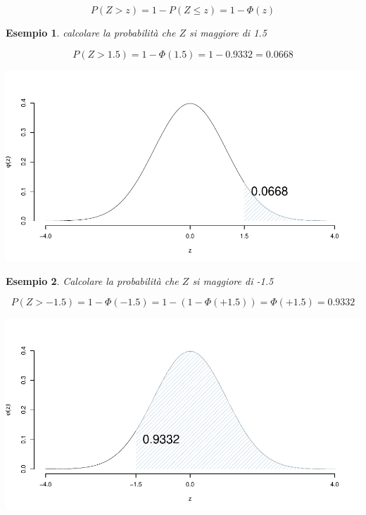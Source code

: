\documentclass[
  11pt,
]{book}
\theoremstyle{mytheoremstyle}
\theoremstyle{mydefstyle}
\newtheorem{example}{{Esempio}}[section]
\begin{document}
\[P(Z>z)=1-P(Z\leq z)=1-\Phi(z)\]

\begin{example}

calcolare la probabilità che \(Z\) si maggiore di 1.5

\[P(Z > 1.5) = 1-\Phi(1.5)=1-0.9332=0.0668\]

\begin{center}\includegraphics{Appunti_di_Statistica_2025_files/figure-latex/07c-Normale-17,-1} \end{center}

\end{example}

\begin{example}

Calcolare la probabilità che \(Z\) si maggiore di -1.5

\[P(Z > -1.5) = 1-\Phi(-1.5)=1-(1-\Phi(+1.5))=\Phi(+1.5)=0.9332\]

\begin{center}\includegraphics{Appunti_di_Statistica_2025_files/figure-latex/07c-Normale-19,-1} \end{center}

\end{example}
\end{document}
